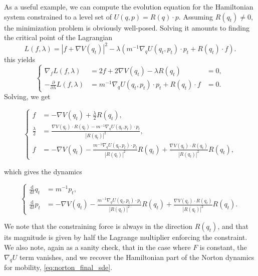 \begin{example}
    \label{ex:constrained_dynamics}
    As a useful example, we can compute the evolution equation for the Hamiltonian system constrained to a level set of $U(q,p)=R(q)\cdot p$.
    Assuming $R(q_t)\neq 0$, the minimization problem is obviously well-posed. Solving it amounts to finding the critical point of the Lagrangian
    \[L(f,\lambda)=|f+\nabla V(q_t)|^2-\lambda (m^{-1}\nabla_q U(q_t,p_t)\cdot p_t +R(q_t)\cdot f).\]
    this yields 
    \begin{equation}
        \left\{
            \begin{aligned}
                \nabla_f L(f,\lambda)&=2f+2\nabla V(q_t)-\lambda R(q_t)&=0,\\
                -\frac{\partial}{\partial \lambda}L(f,\lambda)&=m^{-1}\nabla_q U(q_t,p_t)\cdot p_t +R(q_t)\cdot f&=0.
            \end{aligned}
        \right.
    \end{equation}
Solving, we get 

\begin{equation}
    \left\{
        \begin{aligned}
            f&=-\nabla V(q_t)+\frac\lambda2 R(q_t),\\
            \frac\lambda2&=\frac{\nabla V(q_t)\cdot R(q_t)-m^{-1}\nabla_q U(q_t,p_t)\cdot p_t}{|R(q_t)|^2},\\
            f&  =-\nabla V(q_t)-\frac{m^{-1}\nabla_q U(q_t,p_t)\cdot p_t}{|R(q_t)|^2}R(q_t)+\frac{\nabla V(q_t)\cdot R(q_t)}{|R(q_t)|^2}R(q_t),
        \end{aligned}
    \right.
\end{equation}

which gives the dynamics

\begin{equation}
    \label{eq:nonholonomic_constrained_dynamics}
    \left\{\begin{aligned}
    \frac{\mathrm{d}}{\mathrm{d}t}q_t&=m^{-1}p_t,\\
    \frac{\mathrm{d}}{\mathrm{d}t}p_t&=-\nabla V(q_t)-\frac{m^{-1}\nabla_q U(q_t,p_t)\cdot p_t}{|R(q_t)|^2}R(q_t)+\frac{\nabla V(q_t)\cdot R(q_t)}{|R(q_t)|^2}R(q_t).
    \end{aligned}\right.
\end{equation}

We note that the constraining force is always in the direction $R(q_t)$, and that its magnitude is given by half the Lagrange multiplier enforcing the constraint.
We also note, again as a sanity check, that in the case where $F$ is constant, the $\nabla_q U$ term vanishes, and we recover the Hamiltonian part of the Norton dynamics for mobility, \eqref{eq:norton_final_sde}.

\end{example}

